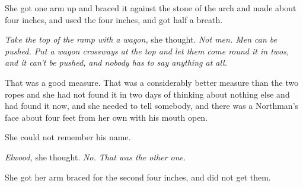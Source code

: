 She got one arm up and braced it against the stone of the arch and made about four inches, and used the four inches, and got half a breath.

\textit{Take the top of the ramp with a wagon,} she thought. \textit{Not men. Men can be pushed. Put a wagon crossways at the top and let them come round it in twos, and it can’t be pushed, and nobody has to say anything at all.}

That was a good measure. That was a considerably better measure than the two ropes and she had not found it in two days of thinking about nothing else and had found it now, and she needed to tell somebody, and there was a Northman’s face about four feet from her own with his mouth open.

She could not remember his name.

\textit{Elwood,} she thought. \textit{No. That was the other one.}

She got her arm braced for the second four inches, and did not get them.